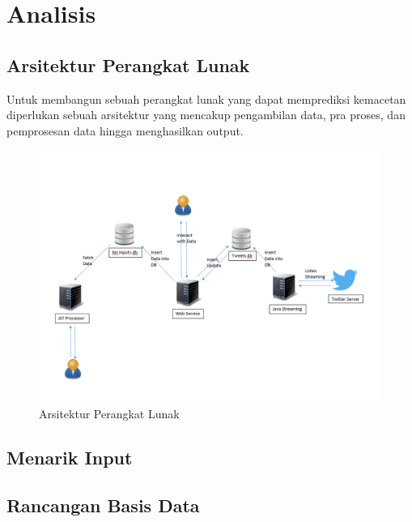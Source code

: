 \chapter{Analisis}
\section{Arsitektur Perangkat Lunak}
Untuk membangun sebuah perangkat lunak yang dapat memprediksi kemacetan diperlukan sebuah arsitektur yang mencakup pengambilan data, pra proses, dan pemprosesan data hingga menghasilkan output.
\begin{figure}
\centering
\includegraphics[width=\linewidth]{Gambar/mine/sistem}
\caption[Arsitektur Perangkat Lunak]{Arsitektur Perangkat Lunak} 
\label{fig:arsitekturpl}
\end{figure}
\section{Menarik Input}
\section{Rancangan Basis Data}